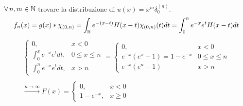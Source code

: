 $\forall n, m\in \NN $ trovare la distribuzione di $u(x) = x^{m} \delta^{(n)}_{0}$.
\Soluzione
\begin{equation*}
f_{n} (x) = g(x)*\chi_{(0, n)} = \int_{\mathbb{R}} e^{- (x - t)} H(x - t)\chi_{(0, n)} (t)dt = \int^{n}_{0} e^{- x} e^{t} H(x - t)dt
\end{equation*}
\begin{gather*}
\begin{cases}
0, & x < 0\\
\int^{x}_{0} e^{- x} e^{t} dt, & 0 \leq x \leq n\\
\int^{n}_{0} e^{- x} e^{t} dt, & x > n
\end{cases} =
\begin{cases}
0, & x < 0\\
e^{- x}\left(e^{x} - 1\right) = 1 - e^{- x} & 0 \leq x \leq n\\
e^{- x} (e^{n} - 1) & x > n
\end{cases}\\
\\
\xrightarrow{n\rightarrow \infty} F(x) =
\begin{cases}
0, & x < 0\\
1 - e^{- x}, & x \geq 0
\end{cases}
\end{gather*}

